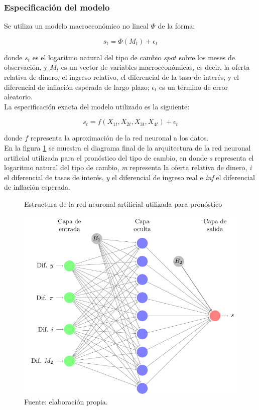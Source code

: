 \subsubsection{Especificación del modelo}

Se utiliza un modelo macroeconómico no lineal $\Phi$ de la forma: 

\[	s_t = \Phi (M_t) + \epsilon_t \]

donde $s_t$ es el logaritmo natural del tipo de cambio $spot$ sobre los meses de observación, y $M_t$ es un vector de variables macroeconómicas, es decir, la oferta relativa de dinero, el ingreso relativo, el diferencial de la tasa de interés, y el diferencial de inflación esperada de largo plazo; $\epsilon_t$ es un término de error aleatorio.\\

La especificación exacta del modelo utilizado es la siguiente:

\begin{equation}
s_t = f(X_{1t}, X_{2t}, X_{3t}, X_{4t}) + \epsilon_t
\label{annModel}
\end{equation}

donde $f$ representa la aproximación de la red neuronal a los datos.\\


En la figura \ref{fig:ann_monetary9} se muestra el diagrama final de la arquitectura de la red neuronal artificial utilizada para el pronóstico del tipo de cambio, en donde \textit{s} representa el logaritmo natural del tipo de cambio, \textit{m} representa la oferta relativa de dinero, \textit{i} el diferencial de tasas de interés, \textit{y} el diferencial de ingreso real e \textit{inf} el diferencial de inflación esperada.

\begin{figure}[ht]
	\centering
	\caption{Estructura de la red neuronal artificial utilizada para pronóstico}
	\label{fig:ann_monetary9}
	\includegraphics[width=0.8\linewidth]{figuras/spec_ann.pdf}
	\caption*{Fuente: elaboración propia.}
\end{figure}


